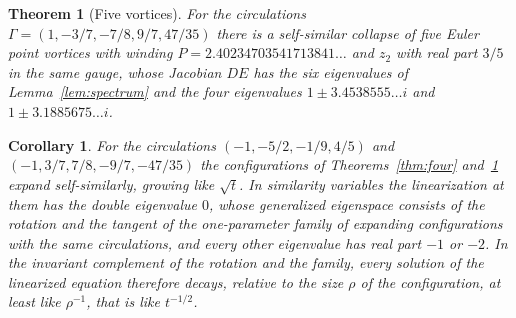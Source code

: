 \documentclass[11pt]{article}
\newtheorem{theorem}{Theorem}
\newtheorem{corollary}{Corollary}
\theoremstyle{definition}
\begin{document}
\begin{theorem}[Five vortices]\label{thm:five}
For the circulations $\Gamma = (1, -3/7, -7/8, 9/7, 47/35)$ there is a self-similar collapse of five Euler point vortices with winding $P = 2.40234703541713841\ldots$ and $z_2$ with real part $3/5$ in the same gauge, whose Jacobian $DE$ has the six eigenvalues of Lemma~\ref{lem:spectrum} and the four eigenvalues $1 \pm 3.4538555\ldots i$ and $1 \pm 3.1885675\ldots i$.
\end{theorem}

\begin{corollary}\label{cor:expansion}
For the circulations $(-1, -5/2, -1/9, 4/5)$ and $(-1, 3/7, 7/8, -9/7, -47/35)$ the configurations of Theorems~\ref{thm:four} and~\ref{thm:five} expand self-similarly, growing like $\sqrt{t}$. In similarity variables the linearization at them has the double eigenvalue $0$, whose generalized eigenspace consists of the rotation and the tangent of the one-parameter family of expanding configurations with the same circulations, and every other eigenvalue has real part $-1$ or $-2$. In the invariant complement of the rotation and the family, every solution of the linearized equation therefore decays, relative to the size $\rho$ of the configuration, at least like $\rho^{-1}$, that is like $t^{-1/2}$.
\end{corollary}
\end{document}

